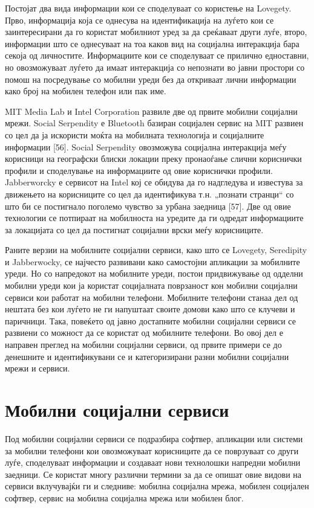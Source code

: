 Постојат два вида информации кои се споделуваат со користење на Lovegety. Прво,
информација која се однесува на идентификација на луѓето кои се заинтересирани
да го користат мобилниот уред за да среќаваат други луѓе, второ, информации што
се однесуваат на тоа каков вид на социјална интеракција бара секоја од
личностите. Информациите кои се споделуваат се прилично едноставни, но
овозможуваат луѓето да имаат интеракција со непознати во јавни простори со помош
на посредување со мобилни уреди без да откриваат лични информации како број на
мобилен телефон или пак име.

MIT Media Lab и Intel Corporation развиле две од првите мобилни социјални мрежи.
Social Serpendity е Bluetooth базиран социјален сервис на MIT развиен со цел да
ја искористи моќта на мобилната технологија и социјалните информации [56].
Social Serpendity овозможува социјална интеракција меѓу корисници на географски
блиски локации преку пронаоѓање слични кориснички профили и споделување на
информациите од овие кориснички профили. Jabberworcky е сервисот на Intel кој се
обидува да го надгледува и известува за движењето на корисниците со цел да
идентификува т.н. „познати странци“ со што би се постигнало поголемо чувство за
урбана заедница [57]. Две од овие технологии се потпираат на мобилноста на
уредите да ги одредат информациите за локацијата со цел да постигнат социјални
врски меѓу корисниците.

Раните верзии на мобилните социјални сервиси, како што се Lovegety, Seredipity и
Jabberwocky, се најчесто развивани како самостојни апликации за мобилните уреди.
Но со напредокот на мобилните уреди, постои придвижување од одделни мобилни
уреди кои ја користат социјалната поврзаност кон мобилни социјални сервиси кои
работат на мобилни телефони. Мобилните телефони станаа дел од нештата без кои
луѓето не ги напуштаат своите домови како што се клучеви и паричници. Така,
повеќето од јавно достапните мобилни социјални сервиси се развиени со можност да
се користат од мобилните телефони. Во овој дел е направен преглед на мобилни
социјални сервиси, од првите примери се до денешните и идентификувани се и
категоризирани разни мобилни социјални мрежи и сервиси. 

\section{Мобилни социјални сервиси} 

Под мобилни социјални сервиси се подразбира софтвер, апликации или системи за
мобилни телефони кои овозможуваат корисниците да се поврзуваат со други луѓе,
споделуваат информации и создаваат нови технолошки напредни мобилни заедници. Се
користат многу различни термини за да се опишат овие видови на сервиси
вклучувајќи ги и следниве: мобилна социјална мрежа, мобилен социјален софтвер,
сервис на мобилна социјална мрежа или мобилен блог.

